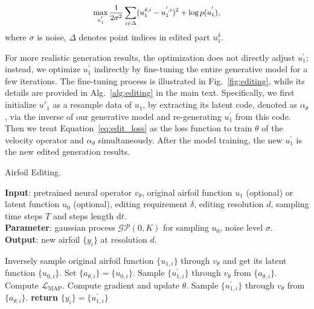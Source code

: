\begin{equation} \small
\label{eq:edit_loss}
\begin{aligned}
    \max_{u_1^{'}} \frac{1}{2\sigma^2} \sum_{i\in\Delta} (u_1^{\delta,i} - u_1^{',i})^2 + \log{p(u_1^{'})},
\end{aligned}
\end{equation}
where  $\sigma$ is noise, $\Delta$ denotes point indices in edited part $u_1^{\delta}$.

For more realistic generation results, the optimization does not directly adjust $u_1^{'}$; instead, we optimize $u_1^{'}$ indirectly by fine-tuning the entire generative model for a few iterations. The fine-tuning process is illustrated in Fig.~\ref{fig:editing}, while its details are provided in Alg.~\ref{alg:editing} in the main text.
Specifically, we first initialize $u'_1$ as a resample data of $u_1$, by extracting its latent code, denoted as $\alpha_\theta$, via the inverse of our generative model and re-generating $u_1^{'}$ from this code. Then we treat Equation~\ref{eq:edit_loss} as the loss function to train $\theta$ of the velocity operator and $\alpha_\theta$ simultaneously. After the model training, the new $u_1^{'}$ is the new edited generation results.

\begin{algorithm}[tb]
    \caption{Airfoil Editing.}
    \label{alg:editing}
    \textbf{Input}: pretrained neural operator $v_{\theta}$, original airfoil function $u_1$ (optional) or latent function $u_0$ (optional), editing requirement $\delta$, editing resolution $d$, sampling time steps $T$ and steps length $\mathrm{d}t$.\\
    \textbf{Parameter}: gaussian process $\mathcal{GP}(0,K)$ for sampling $u_0$, noise level $\sigma$.\\
    \textbf{Output}: new airfoil $\{y_i\}$ at resolution $d$. \\
    \begin{algorithmic}[1] %
        \STATE Inversely sample original airfoil function $\{u_{1,i}\}$ through $v_{\theta}$ and get its latent function $\{u_{0,i}\}$.
        \STATE Set $\{a_{\theta,i}\} = \{u_{0,i}\}$.
        \STATE Sample $\{u_{1,i}^{'}\}$ through $v_{\theta}$ from $\{a_{\theta,i}\}$.
        \STATE Compute $\mathcal{L}_{\mathrm{MAP}}$.
        \STATE Compute gradient and update $\theta$.
        \ENDWHILE
        \STATE Sample $\{u_{1,i}^{'}\}$ through $v_{\theta}$ from $\{a_{\theta,i}\}$.
        \STATE \textbf{return} $\{y_i\}=\{u_{1,i}^{'}\}$
    \end{algorithmic}
\end{algorithm}


